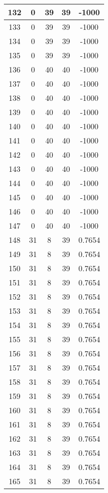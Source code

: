 \documentclass[letterpaper, 12pt]{article}
\begin{document}
\begin{longtable}{|c|c|c|c|c|}
\hline
132 & 0 & 39 & 39 & -1000 \\
\hline
133 & 0 & 39 & 39 & -1000 \\
\hline
134 & 0 & 39 & 39 & -1000 \\
\hline
135 & 0 & 39 & 39 & -1000 \\
\hline
136 & 0 & 40 & 40 & -1000 \\
\hline
137 & 0 & 40 & 40 & -1000 \\
\hline
138 & 0 & 40 & 40 & -1000 \\
\hline
139 & 0 & 40 & 40 & -1000 \\
\hline
140 & 0 & 40 & 40 & -1000 \\
\hline
141 & 0 & 40 & 40 & -1000 \\
\hline
142 & 0 & 40 & 40 & -1000 \\
\hline
143 & 0 & 40 & 40 & -1000 \\
\hline
144 & 0 & 40 & 40 & -1000 \\
\hline
145 & 0 & 40 & 40 & -1000 \\
\hline
146 & 0 & 40 & 40 & -1000 \\
\hline
147 & 0 & 40 & 40 & -1000 \\
\hline
148 & 31 & 8 & 39 & 0.7654 \\
\hline
149 & 31 & 8 & 39 & 0.7654 \\
\hline
150 & 31 & 8 & 39 & 0.7654 \\
\hline
151 & 31 & 8 & 39 & 0.7654 \\
\hline
152 & 31 & 8 & 39 & 0.7654 \\
\hline
153 & 31 & 8 & 39 & 0.7654 \\
\hline
154 & 31 & 8 & 39 & 0.7654 \\
\hline
155 & 31 & 8 & 39 & 0.7654 \\
\hline
156 & 31 & 8 & 39 & 0.7654 \\
\hline
157 & 31 & 8 & 39 & 0.7654 \\
\hline
158 & 31 & 8 & 39 & 0.7654 \\
\hline
159 & 31 & 8 & 39 & 0.7654 \\
\hline
160 & 31 & 8 & 39 & 0.7654 \\
\hline
161 & 31 & 8 & 39 & 0.7654 \\
\hline
162 & 31 & 8 & 39 & 0.7654 \\
\hline
163 & 31 & 8 & 39 & 0.7654 \\
\hline
164 & 31 & 8 & 39 & 0.7654 \\
\hline
165 & 31 & 8 & 39 & 0.7654 \\

\end{longtable}
\end{document}
